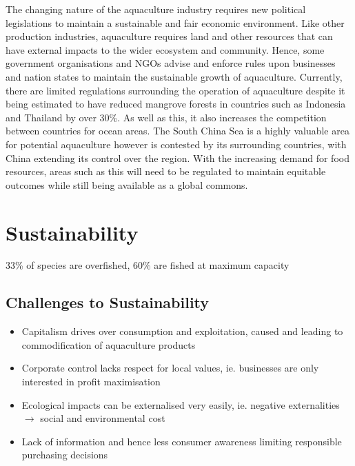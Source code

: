 	The changing nature of the aquaculture industry requires new political legislations to maintain a sustainable and fair economic environment. Like other production industries, aquaculture requires land and other resources that can have external impacts to the wider ecosystem and community. Hence, some government organisations and NGOs advise and enforce rules upon businesses and nation states to maintain the sustainable growth of aquaculture. Currently, there are limited regulations surrounding the operation of aquaculture despite it being estimated to have reduced mangrove forests in countries such as Indonesia and Thailand by over 30\%. As well as this, it also increases the competition between countries for ocean areas. The South China Sea is a highly valuable area for potential aquaculture however is contested by its surrounding countries, with China extending its control over the region. With the increasing demand for food resources, areas such as this will need to be regulated to maintain equitable outcomes while still being available as a global commons.

\section{Sustainability} \label{14/11/2024}
	33\% of species are overfished, 60\% are fished at maximum capacity

	\subsection{Challenges to Sustainability}
		\begin{itemize}
			\item Capitalism drives over consumption and exploitation, caused and leading to commodification of aquaculture products
			\item Corporate control lacks respect for local values, ie. businesses are only interested in profit maximisation
			\item Ecological impacts can be externalised very easily, ie. negative externalities $\rightarrow$ social and environmental cost
			\item Lack of information and hence less consumer awareness limiting responsible purchasing decisions
		\end{itemize}

